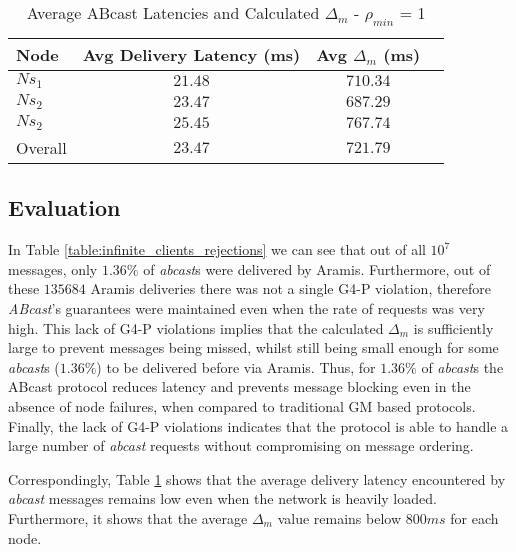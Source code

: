 \begin{table}[p]
  \begin{center}
  \renewcommand{\arraystretch}{1.3}
   \begin{tabular}{|l|c|c|c|}
    \hline
    Node      & Avg Delivery Latency (ms) & Avg $\Delta_m$ (ms) \\ \hline \hline
    $Ns_1$   & $21.48$                           & $710.34$                   \\ \hline
    $Ns_2$   & $23.47$                           & $687.29$                  \\ \hline
    $Ns_2$   & $25.45$                           & $767.74$                   \\ \hline \hline
    Overall   & $23.47$                           & $721.79$                 \\ \hline
    \end{tabular}
    \caption{Average \textsf{ABcast} Latencies and Calculated $\Delta_m$ - $\rho_{min}$ = 1}
    \label{table:infinite_clients_aramis_latencies}
  \end{center}
\end{table}       

    \subsection{Evaluation}
    In Table \ref{table:infinite_clients_rejections} we can see that out of all $10^7$ messages, only $1.36\%$ of \emph{abcast}s were delivered by \textsf{Aramis}.  Furthermore, out of these $135684$ \textsf{Aramis} deliveries there was not a single G4-P violation, therefore \emph{ABcast}'s guarantees were maintained even when the rate of requests was very high.  This lack of G4-P violations implies that the calculated $\Delta_m$ is sufficiently large to prevent messages being missed, whilst still being small enough for some \emph{abcast}s ($1.36\%$) to be delivered before via \textsf{Aramis}.  Thus, for $1.36\%$ of \emph{abcast}s the \textsf{ABcast} protocol reduces latency and prevents message blocking even in the absence of node failures, when compared to traditional GM based protocols.  Finally, the lack of G4-P violations indicates that the protocol is able to handle a large number of \emph{abcast} requests without compromising on message ordering.  
       
    Correspondingly, Table \ref{table:infinite_clients_aramis_latencies} shows that the average delivery latency encountered by \emph{abcast} messages remains low even when the network is heavily loaded.  Furthermore, it shows that the average $\Delta_m$ value remains below $800ms$ for each node.  
    
